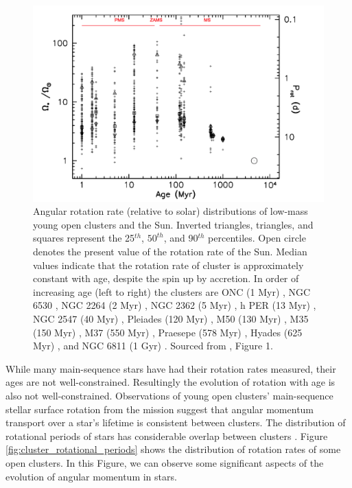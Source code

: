 \begin{figure}
    \includegraphics[width=\textwidth]{Figures/intro_figures/pms_evo.png}
    \caption[Angular rotation rate distributions of low-mass young open clusters and the Sun over time.]{Angular rotation rate (relative to solar) distributions of low-mass young open clusters and the Sun. Inverted triangles, triangles, and squares represent the 25$^{th}$, $50^{th}$, and 90$^{th}$ percentiles. Open circle denotes the present value of the rotation rate of the Sun. Median values indicate that the rotation rate of cluster is approximately constant with age, despite the spin up by accretion. In order of increasing age (left to right) the clusters are ONC (1 Myr) \citep{herbst_stellar_2002}, NGC 6530 \citep{henderson_time-series_2012}, NGC 2264 (2 Myr) \citep{affer_rotation_2013}, NGC 2362 (5 Myr) \citep{irwin_monitor_2008}, h PER (13 Myr) \citep{moraux_monitor_2013}, NGC 2547 (40 Myr) \citep{irwin_monitor_2008}, Pleiades (120 Myr) \citep{hartman_large_2010}, M50 (130 Myr) \citep{irwin_monitor_2009}, M35 (150 Myr) \citep{meibom_slar_2009}, M37 (550 Myr) \citep{hartman_deep_2009}, Praesepe (578 Myr) \citep{delorme_stellar_2011}, Hyades (625 Myr) \citep{delorme_stellar_2011}, and NGC 6811 (1 Gyr) \citep{meibom_kepler_2011}.  Sourced from \citet{gallet_improved_2013},  Figure 1.}
    \label{fig:pms_ms_evo}
\end{figure}

While many main-sequence stars have had their rotation rates measured, their ages are not well-constrained.
Resultingly the evolution of rotation with age is also not well-constrained.
Observations of young open clusters' main-sequence stellar surface rotation from the \kepler{} mission suggest that angular momentum transport over a star's lifetime is consistent between clusters.
The distribution of rotational periods of stars has considerable overlap between clusters \citep{spina_how_2020, curtis_when_2020}. 
Figure \ref{fig:cluster_rotational_periods} shows the distribution of rotation rates of some open clusters.
In this Figure, we can observe some significant aspects of the evolution of angular momentum in stars.


